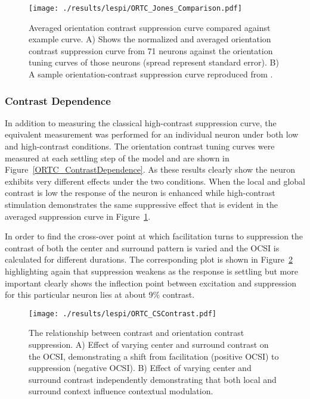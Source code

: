\begin{figure}
	\centering
        \texttt{[image: ./results/lespi/ORTC\_Jones\_Comparison.pdf]}
	\caption[Averaged orientation-contrast suppression curve compared
      against \cite{Jones2002} example curve.]{Averaged orientation
      contrast suppression curve compared against \cite{Jones2002}
      example curve. A) Shows the normalized and averaged orientation
      contrast suppression curve from 71 neurons against the
      orientation tuning curves of those neurons (spread represent
      standard error). B) A sample orientation-contrast suppression
      curve reproduced from \cite{Jones2002}.}
	\label{ORTC_Jones}
\end{figure}

\subsubsection{Contrast Dependence}

In addition to measuring the classical high-contrast suppression
curve, the equivalent measurement was performed for an individual
neuron under both low and high-contrast conditions. The orientation
contrast tuning curves were measured at each settling step of the
model and are shown in Figure~\ref{ORTC_ContrastDependence}. As these
results clearly show the neuron exhibits very different effects under
the two conditions. When the local and global contrast is low the
response of the neuron is enhanced while high-contrast stimulation
demonstrates the same suppressive effect that is evident in the
averaged suppression curve in Figure~\ref{ORTC_Jones}.

In order to find the cross-over point at which facilitation turns to
suppression the contrast of both the center and surround pattern is
varied and the OCSI is calculated for different durations. The
corresponding plot is shown in Figure~\ref{ORTC_ContrastCurve}
highlighting again that suppression weakens as the response is
settling but more important clearly shows the inflection point between
excitation and suppression for this particular neuron lies at about
9\% contrast.

\begin{figure}
	\centering
        \texttt{[image: ./results/lespi/ORTC\_CSContrast.pdf]}
	\caption[Contrast dependent switch from facilitation to
      suppression.]{The relationship between contrast and orientation
      contrast suppression. A) Effect of varying center and surround
      contrast on the OCSI, demonstrating a shift from facilitation
      (positive OCSI) to suppression (negative OCSI). B) Effect of
      varying center and surround contrast independently demonstrating
      that both local and surround context influence contextual
      modulation.}
	\label{ORTC_ContrastCurve}
\end{figure}

